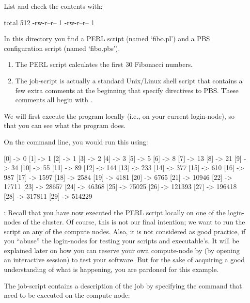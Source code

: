 List and check the contents with:

\begin{prompt}
total 512
-rw-r--r-- 1 %
-rw-r--r-- 1 %
\end{prompt}

In this directory you find a PERL script (named `fibo.pl') and a PBS
configuration script (named `fibo.pbs').

\begin{enumerate}
\item  The PERL script calculates the first 30 Fibonacci numbers.
\item  The job-script is actually a standard Unix/Linux shell script that
  contains a few extra comments at the beginning that specify directives to
  PBS.  These comments all begin with .
\end{enumerate}

We will first execute the program locally (i.e., on your current login-node),
so that you can see what the program does.

On the command line, you would run this using:
\begin{prompt}
[0] -> 0
[1] -> 1
[2] -> 1
[3] -> 2
[4] -> 3
[5] -> 5
[6] -> 8
[7] -> 13
[8] -> 21
[9] -> 34
[10] -> 55
[11] -> 89
[12] -> 144
[13] -> 233
[14] -> 377
[15] -> 610
[16] -> 987
[17] -> 1597
[18] -> 2584
[19] -> 4181
[20] -> 6765
[21] -> 10946
[22] -> 17711
[23] -> 28657
[24] -> 46368
[25] -> 75025
[26] -> 121393
[27] -> 196418
[28] -> 317811
[29] -> 514229
\end{prompt}

: Recall that you have now executed the PERL script locally on
one of the login-nodes of the \hpc cluster.  Of course, this is not our final
intention; we want to run the script on any of the compute nodes. Also, it is
not considered as good practice, if you ``abuse'' the login-nodes for testing
your scripts and executable's. It will be explained later on how you can
reserve your own compute-node by (by opening an interactive session) to test
your software. But for the sake of acquiring a good understanding of what is
happening, you are pardoned for this example.

The job-script contains a description of the job by specifying the command that
need to be executed on the compute node:


